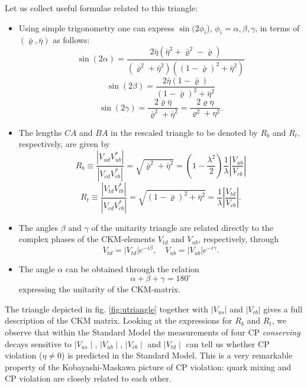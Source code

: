 \documentclass[12pt]{article}
\newcommand{\vcb}{|V_{cb}|}
\newcommand{\beq}{\begin{equation}}
\newcommand{\eeq}{\end{equation}}
\newcommand{\bi}{\begin{itemize}}
\newcommand{\ei}{\end{itemize}}
\begin{document}
\begin{itemize}
Let us collect useful formulae related to this triangle:
\bi
\item
Using simple trigonometry one can express $\sin(2\phi_i$), $\phi_i=
\alpha, \beta, \gamma$, in terms of $(\bar\varrho,\bar\eta)$ as follows:
\begin{equation}\label{2.89}
\sin(2\alpha)=\frac{2\bar\eta(\bar\eta^2+\bar\varrho^2-\bar\varrho)}
  {(\bar\varrho^2+\bar\eta^2)((1-\bar\varrho)^2
  +\bar\eta^2)}  
\end{equation}
\begin{equation}\label{2.90}
\sin(2\beta)=\frac{2\bar\eta(1-\bar\varrho)}{(1-\bar\varrho)^2 + \bar\eta^2}
\end{equation}
 \begin{equation}\label{2.91}
\sin(2\gamma)=\frac{2\bar\varrho\bar\eta}{\bar\varrho^2+\bar\eta^2}=
\frac{2\varrho\eta}{\varrho^2+\eta^2}.
\end{equation}
\item
The lengths $CA$ and $BA$ in the
rescaled triangle  to be denoted by $R_b$ and $R_t$,
respectively, are given by
%
\begin{equation}\label{2.94}
R_b \equiv \frac{| V_{ud}^{}V^*_{ub}|}{| V_{cd}^{}V^*_{cb}|}
= \sqrt{\bar\varrho^2 +\bar\eta^2}
= (1-\frac{\lambda^2}{2})\frac{1}{\lambda}
\left| \frac{V_{ub}}{V_{cb}} \right|
\end{equation}
\begin{equation}\label{2.95}
R_t \equiv \frac{| V_{td}^{}V^*_{tb}|}{| V_{cd}^{}V^*_{cb}|} =
 \sqrt{(1-\bar\varrho)^2 +\bar\eta^2}
=\frac{1}{\lambda} \left| \frac{V_{td}}{V_{cb}} \right|.
\end{equation}
\item
The angles $\beta$ and $\gamma$ of the unitarity triangle are related
directly to the complex phases of the CKM-elements $V_{td}$ and
$V_{ub}$, respectively, through
\beq\label{e417}
V_{td}=|V_{td}|e^{-i\beta},\quad V_{ub}=|V_{ub}|e^{-i\gamma}.
\eeq
\item
The angle $\alpha$ can be obtained through the relation
\beq\label{e419}
\alpha+\beta+\gamma=180^\circ
\eeq
expressing the unitarity of the CKM-matrix.
\ei

The triangle depicted in fig. \ref{fig:utriangle} together with $|V_{us}|$ 
and $\vcb$ gives a full description of the CKM matrix. 
Looking at the expressions for $R_b$ and $R_t$, we observe that within
the Standard Model the measurements of four CP
{\it conserving } decays sensitive to $\mid V_{us}\mid$, $\mid V_{ub}\mid$,   
$\mid V_{cb}\mid $ and $\mid V_{td}\mid$ can tell us whether CP violation
($\eta \not= 0$) is predicted in the Standard Model. 
This is a very remarkable property of
the Kobayashi-Maskawa picture of CP violation: quark mixing and CP violation
are closely related to each other. 


\end{itemize}
\end{document}
